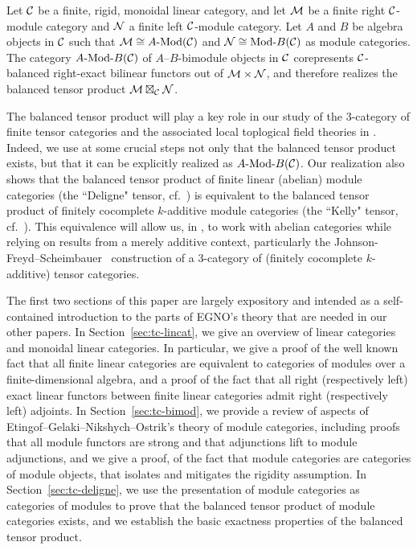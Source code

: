 \documentclass{amsart}
\begin{document}
\begin{theorem*}
Let $\mathcal C$ be a finite, rigid, monoidal linear category, and let $\mathcal M$ be a finite right $\mathcal C$-module category and $\mathcal N$ a finite left $\mathcal C$-module category.  Let $A$ and $B$ be algebra objects in $\mathcal C$ such that $\cM \cong \Mod{A}{}(\cC)$ and $\cN \cong \Mod{}{B}(\cC)$ as module categories.  The category $\Mod{A}{B}(\cC)$ of $A$--$B$-bimodule objects in $\mathcal C$ corepresents $\mathcal C$-balanced right-exact bilinear functors out of $\mathcal M \times \mathcal N$, and therefore realizes the balanced tensor product $\mathcal M \boxtimes_\mathcal C \mathcal N$.
\end{theorem*}

The balanced tensor product will play a key role in our study of the $3$-category of finite tensor categories and the associated local toplogical field theories in \cite{DTCI}.  Indeed, we use at some crucial steps not only that the balanced tensor product exists, but that it can be explicitly realized as $\Mod{A}{B}(\cC)$.  Our realization also shows that the balanced tensor product of finite linear (abelian) module categories (the ``Deligne" tensor, cf.~\cite{MR1106898}) is equivalent to the balanced tensor product of finitely cocomplete $k$-additive module categories (the ``Kelly" tensor, cf.~\cite{MR651714, MR648793}).  This equivalence will allow us, in \cite{DTCI}, to work with abelian categories while relying on results from a merely additive context, particularly the Johnson-Freyd--Scheimbauer~\cite{1502.06526} construction of a 3-category of (finitely cocomplete $k$-additive) tensor categories.

The first two sections of this paper are largely expository and intended as a self-contained introduction to the parts of EGNO's theory that are needed in our other papers.  In Section~\ref{sec:tc-lincat}, we give an overview of linear categories and monoidal linear categories.  In particular, we give a proof of the well known fact that all finite linear categories are equivalent to categories of modules over a finite-dimensional algebra, and a proof of the fact that all right (respectively left) exact linear functors between finite linear categories admit right (respectively left) adjoints.  In Section~\ref{sec:tc-bimod}, we provide a review of aspects of Etingof--Gelaki--Nikshych--Ostrik's theory of module categories, including proofs that all module functors are strong and that adjunctions lift to module adjunctions, and we give a proof, of the fact that module categories are categories of module objects, that isolates and mitigates the rigidity assumption.  In Section~\ref{sec:tc-deligne}, we use the presentation of module categories as categories of modules to prove that the balanced tensor product of module categories exists, and we establish the basic exactness properties of the balanced tensor product.
\end{document}
